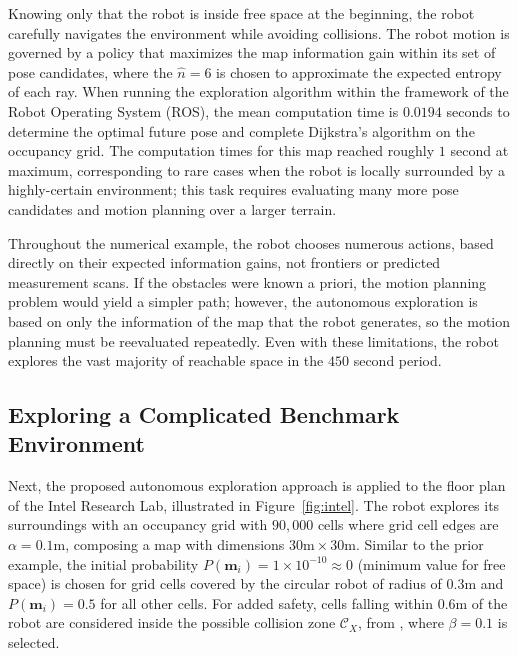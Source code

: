 Knowing only that the robot is inside free space at the beginning, the robot carefully navigates the environment while avoiding collisions. The robot motion is governed by a policy that maximizes the map information gain within its set of pose candidates, where the $\hat n=6$ is chosen to approximate the expected entropy of each ray. 
When running the exploration algorithm within the framework of the Robot Operating System (ROS), the mean computation time is $0.0194$ seconds to determine the optimal future pose and complete Dijkstra's algorithm on the occupancy grid.
The computation times for this map reached roughly $1$ second at maximum, corresponding to rare cases when the robot is locally surrounded by a highly-certain environment; this task requires evaluating many more pose candidates and motion planning over a larger terrain.

Throughout the numerical example, the robot chooses numerous actions, based directly on their expected information gains, not frontiers or predicted measurement scans. If the obstacles were known a priori, the motion planning problem would yield a simpler path; however, the autonomous exploration is based on only the information of the map that the robot generates, so the motion planning must be reevaluated repeatedly. Even with these limitations, the robot explores the vast majority of reachable space in the $450$ second period. 





\subsection{Exploring a Complicated Benchmark Environment}

Next, the proposed autonomous exploration approach is applied to the floor plan of the Intel Research Lab, illustrated in Figure~\ref{fig:intel}.
The robot explores its surroundings with an occupancy grid with $90,000$ cells where grid cell edges are $\alpha=0.1$m, composing a map with dimensions $30\text{m}\times30\text{m}$.
Similar to the prior example, the initial probability $P(\mathbf{m}_i)=1\times10^{-10}\approx0$ (minimum value for free space) is chosen for grid cells covered by the circular robot of radius of $0.3$m and $P(\mathbf{m}_i)=0.5$ for all other cells.
For added safety, cells falling within $0.6$m of the robot are considered inside the possible collision zone $\mathcal{C}_X$, from , where $\beta=0.1$ is selected. 

